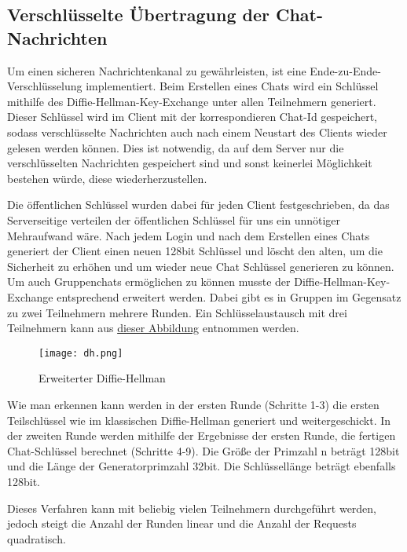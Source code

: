 \author{Troy Keßler, Michael Angermeier}
\subsection{Verschlüsselte Übertragung der Chat-Nachrichten}\label{encryption}
Um einen sicheren Nachrichtenkanal zu gewährleisten, ist eine Ende-zu-Ende-Verschlüsselung implementiert. 
Beim Erstellen eines Chats wird ein Schlüssel mithilfe des Diffie-Hellman-Key-Exchange unter allen Teilnehmern generiert.
Dieser Schlüssel wird im Client mit der korrespondieren Chat-Id gespeichert, sodass verschlüsselte Nachrichten
auch nach einem Neustart des Clients wieder gelesen werden können. Dies ist notwendig, da auf dem Server nur die verschlüsselten
Nachrichten gespeichert sind und sonst keinerlei Möglichkeit bestehen würde, diese wiederherzustellen. 

Die öffentlichen Schlüssel wurden dabei für jeden Client festgeschrieben, da das Serverseitige verteilen der öffentlichen Schlüssel für uns ein unnötiger Mehraufwand wäre.
Nach jedem Login und nach dem Erstellen eines Chats generiert der Client einen neuen 128bit Schlüssel und löscht den alten, um die Sicherheit zu erhöhen und um wieder neue Chat Schlüssel generieren zu können.
Um auch Gruppenchats ermöglichen zu können musste der Diffie-Hellman-Key-Exchange entsprechend erweitert werden.
Dabei gibt es in Gruppen im Gegensatz zu zwei Teilnehmern mehrere Runden.
Ein Schlüsselaustausch mit drei Teilnehmern kann aus \hyperref[DHKE]{dieser Abbildung} entnommen werden.

\begin{figure}[h]
  \centering
  \texttt{[image: dh.png]}
  
  \caption{Erweiterter Diffie-Hellman}
  \label{DHKE}
\end{figure}

Wie man erkennen kann werden in der ersten Runde (Schritte 1-3) die ersten Teilschlüssel wie im klassischen Diffie-Hellman generiert und weitergeschickt.
In der zweiten Runde werden mithilfe der Ergebnisse der ersten Runde, die fertigen Chat-Schlüssel berechnet (Schritte 4-9).
Die Größe der Primzahl n beträgt 128bit und die Länge der Generatorprimzahl 32bit. Die Schlüssellänge beträgt ebenfalls 128bit.

Dieses Verfahren kann mit beliebig vielen Teilnehmern durchgeführt werden, 
jedoch steigt die Anzahl der Runden linear und die Anzahl der Requests quadratisch.

